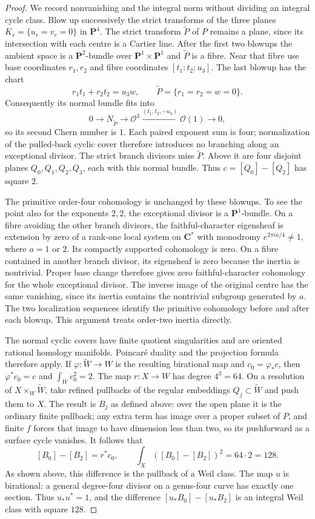 \documentclass[11pt]{article}
\theoremstyle{definition}
\theoremstyle{remark}
\begin{document}
\begin{proof}
We record nonvanishing and the integral norm without dividing an integral
cycle class.  Blow up successively the strict transforms of the three
planes $K_r=\{u_r=v_r=0\}$ in $\mathbf P^4$.  The strict transform
$\widetilde P$ of $P$ remains a plane, since its intersection with each
centre is a Cartier line.  After the first two blowups the ambient space
is a $\mathbf P^2$-bundle over $\mathbf P^1\times\mathbf P^1$ and
$\widetilde P$ is a fibre.  Near that fibre use base coordinates $r_1,r_2$
and fibre coordinates $[t_1:t_2:u_3]$.  The last blowup has the chart
\[
 r_1t_1+r_2t_2=u_3w,
 \qquad \widetilde P=\{r_1=r_2=w=0\}.
\]
Consequently its normal bundle fits into
\[
 0\longrightarrow N_{\widetilde P}\longrightarrow\mathcal O^3
 \xrightarrow{(t_1,t_2,-u_3)}\mathcal O(1)\longrightarrow0,
\]
so its second Chern number is $1$.  Each paired exponent sum is four;
normalization of the pulled-back cyclic cover therefore introduces no
branching along an exceptional divisor.  The strict branch divisors miss
$\widetilde P$.  Above it are four disjoint planes
$Q_0,Q_1,Q_2,Q_3$, each with this normal bundle.
Thus $c=[Q_0]-[Q_2]$ has square $2$.

The primitive order-four cohomology is unchanged by these blowups.
To see the point also for the exponents $2,2$, the exceptional divisor
is a $\mathbf P^1$-bundle.  On a fibre avoiding the other branch divisors,
the faithful-character eigensheaf is extension by zero of a rank-one
local system on $\mathbf C^*$ with monodromy $e^{2\pi i a/4}\ne1$,
where $a=1$ or $2$.  Its compactly supported cohomology is zero.
On a fibre contained in another branch divisor, its eigensheaf is zero
because the inertia is nontrivial.  Proper base change therefore gives
zero faithful-character cohomology for the whole exceptional divisor.
The inverse image of the original centre has the same vanishing, since
its inertia contains the nontrivial subgroup generated by $a$.
The two localization sequences identify the primitive cohomology before
and after each blowup.  This argument treats order-two inertia directly.

The normal cyclic covers have finite quotient singularities and are
oriented rational homology manifolds.  Poincar\'e duality and the
projection formula therefore apply.  If $\varphi:\widetilde W\to W$
is the resulting birational map and $c_0=\varphi_*c$, then
$\varphi^*c_0=c$ and $\int_Wc_0^2=2$.
The map $r:X\to W$ has degree $4^3=64$.
On a resolution of $X\times_W\widetilde W$, take refined pullbacks
of the regular embeddings $Q_j\subset\widetilde W$ and push them
to $X$.  The result is $B_j$ as defined above: over the open plane it
is the ordinary finite pullback; any extra term has image over a
proper subset of $P$, and finite $f$ forces that image to have dimension
less than two, so its pushforward as a surface cycle vanishes.
It follows that
\[
 [B_0]-[B_2]=r^*c_0,\qquad
 \int_X([B_0]-[B_2])^2=64\cdot2=128.
\]
As shown above, this difference is the pullback of a Weil class.
The map $u$ is birational: a general degree-four divisor on a genus-four
curve has exactly one section.  Thus $u_*u^*=1$, and the difference
$[u_*B_0]-[u_*B_2]$ is an integral Weil class with square $128$.


\end{proof}
\end{document}
